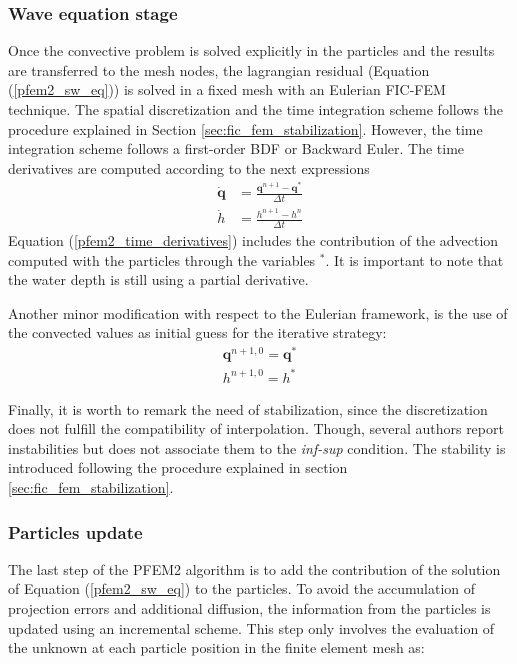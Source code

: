 \subsubsection{Wave equation stage}


Once the convective problem is solved explicitly in the particles and the results are transferred to the mesh nodes, the lagrangian residual (Equation (\ref{pfem2_sw_eq})) is solved in a fixed mesh with an Eulerian FIC-FEM technique. The spatial discretization and the time integration scheme follows the procedure explained in Section \ref{sec:fic_fem_stabilization}.
However, the time integration scheme follows a first-order BDF or Backward Euler.
The time derivatives are computed according to the next expressions
\begin{align} \label{pfem2_time_derivatives}
    \dot{\mathbf{q}} &= \frac{\mathbf{q}^{n+1} - \mathbf{q}^*}{\Delta t} \\
    \dot{h} &= \frac{h^{n+1} - h^n}{\Delta t}
\end{align}
Equation (\ref{pfem2_time_derivatives}) includes the contribution of the advection computed with the particles through the variables $^*$. It is important to note that the water depth is still using a partial derivative.

Another minor modification with respect to the Eulerian framework, is the use of the convected values as initial guess for the iterative strategy:
\begin{align}
    \mathbf{q}^{n+1,0} = \mathbf{q}^* \\
    h^{n+1,0} = h^*
\end{align}

Finally, it is worth to remark the need of stabilization, since the discretization does not fulfill the compatibility of interpolation. Though, several authors report instabilities but does not associate them to the \emph{inf-sup} condition. The stability is introduced following the procedure explained in section \ref{sec:fic_fem_stabilization}.


\subsubsection{Particles update}
The last step of the PFEM2 algorithm is to add the contribution of the solution of Equation (\ref{pfem2_sw_eq}) to the particles. To avoid the accumulation of projection errors and additional diffusion, the information from the particles is updated using an incremental scheme. This step only involves the evaluation of the unknown at each particle position in the finite element mesh as:

